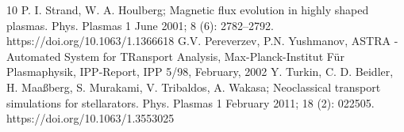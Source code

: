 \documentclass[12pt]{article}
\begin{document}
\begin{thebibliography}{10}
 P. I. Strand, W. A. Houlberg; Magnetic flux evolution in highly shaped plasmas. Phys. Plasmas 1 June 2001; 8 (6): 2782–2792. https://doi.org/10.1063/1.1366618
  G.V. Pereverzev, P.N. Yushmanov, ASTRA - Automated System for TRansport Analysis, Max-Planck-Institut Für Plasmaphysik, IPP-Report, IPP 5/98, February, 2002
 Y. Turkin, C. D. Beidler, H. Maaßberg, S. Murakami, V. Tribaldos, A. Wakasa; Neoclassical transport simulations for stellarators. Phys. Plasmas 1 February 2011; 18 (2): 022505. https://doi.org/10.1063/1.3553025
\end{thebibliography}

\vfill\eject
%
%
\end{document}
